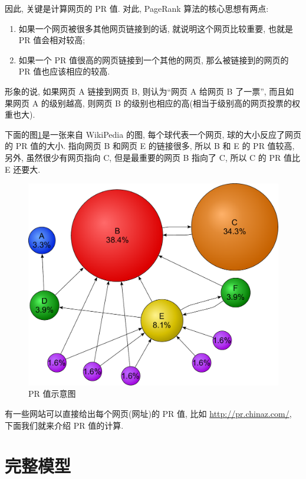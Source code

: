 \documentclass[a4paper,UTF8]{ctexart}
\theoremstyle{plain} \newtheorem{theorem}{定理}[section]
\theoremstyle{plain} \newtheorem{definition}{定义}[section]
\theoremstyle{plain} \newtheorem{lemma}{引理}[section]
\theoremstyle{plain} \newtheorem{proposition}{命题}[section]
\theoremstyle{plain} \newtheorem{example}{例}[section]
\theoremstyle{plain} \newtheorem{remark}{注}[section]
\theoremstyle{plain} \newtheorem{corollary}{推论}[section]
\begin{document}
因此, 关键是计算网页的 PR 值. 对此, PageRank 算法的核心思想有两点:
\begin{enumerate}[(1)]
\item 如果一个网页被很多其他网页链接到的话, 就说明这个网页比较重要, 也就是 PR 值会相对较高;

\item 如果一个 PR 值很高的网页链接到一个其他的网页, 那么被链接到的网页的 PR 值也应该相应的较高.

\end{enumerate}

形象的说, 如果网页 A 链接到网页 B, 则认为“网页 A 给网页 B 了一票”, 而且如果网页 A 的级别越高, 则网页 B 的级别也相应的高(相当于级别高的网页投票的权重也大).

下面的图\ref{example}是一张来自 WikiPedia 的图, 每个球代表一个网页, 球的大小反应了网页的 PR 值的大小. 指向网页 B 和网页 E 的链接很多, 所以 B 和 E 的 PR 值较高, 另外, 虽然很少有网页指向 C, 但是最重要的网页 B 指向了 C, 所以 C 的 PR 值比 E 还要大.
\begin{figure}[!htb]
	\centering
	\includegraphics[width = 0.65 \textwidth]{example.pdf}
	\caption{PR 值示意图}
	\label{example}
\end{figure}



有一些网站可以直接给出每个网页(网址)的 PR 值, 比如 \url{http://pr.chinaz.com/}, 下面我们就来介绍 PR 值的计算.


\section{完整模型}
\end{document}
